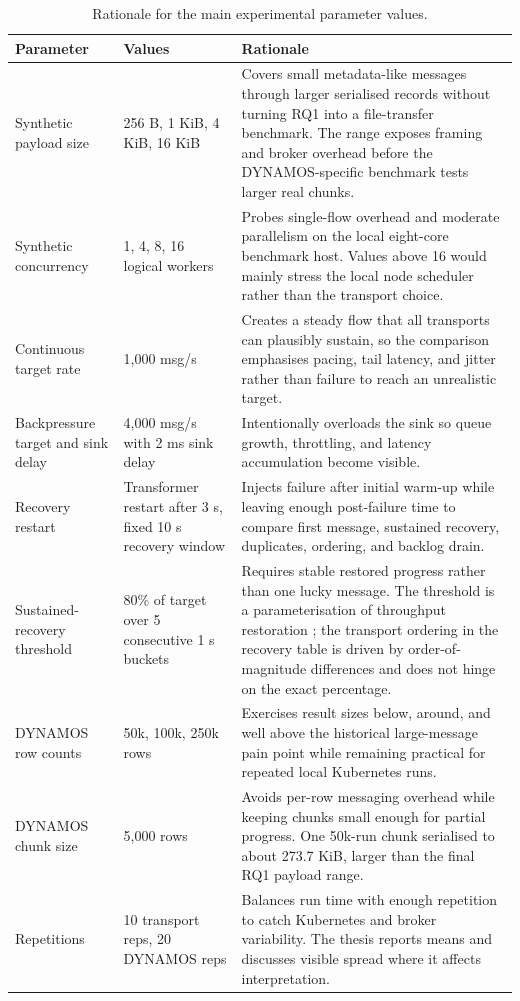 \begin{table}[!htbp]
    \centering
    \scriptsize
    \caption{Rationale for the main experimental parameter values.}
    \label{tab:parameter-rationale}
    \setlength{\tabcolsep}{3pt}
    \begin{tabularx}{\textwidth}{p{}p{}X}
        \toprule
        Parameter & Values & Rationale \\
        \midrule
        Synthetic payload size & 256 B, 1 KiB, 4 KiB, 16 KiB & Covers small metadata-like messages through larger serialised records without turning RQ1 into a file-transfer benchmark. The range exposes framing and broker overhead before the DYNAMOS-specific benchmark tests larger real chunks. \\
        Synthetic concurrency & 1, 4, 8, 16 logical workers & Probes single-flow overhead and moderate parallelism on the local eight-core benchmark host. Values above 16 would mainly stress the local node scheduler rather than the transport choice. \\
        Continuous target rate & 1{,}000 msg/s & Creates a steady flow that all transports can plausibly sustain, so the comparison emphasises pacing, tail latency, and jitter rather than failure to reach an unrealistic target. \\
        Backpressure target and sink delay & 4{,}000 msg/s with 2 ms sink delay & Intentionally overloads the sink so queue growth, throttling, and latency accumulation become visible. \\
        Recovery restart & Transformer restart after 3 s, fixed 10 s recovery window & Injects failure after initial warm-up while leaving enough post-failure time to compare first message, sustained recovery, duplicates, ordering, and backlog drain. \\
        Sustained-recovery threshold & 80\% of target over 5 consecutive 1 s buckets & Requires stable restored progress rather than one lucky message. The threshold is a parameterisation of throughput restoration \cite{vogel2024faultRecovery}; the transport ordering in the recovery table is driven by order-of-magnitude differences and does not hinge on the exact percentage. \\
        DYNAMOS row counts & 50k, 100k, 250k rows & Exercises result sizes below, around, and well above the historical large-message pain point while remaining practical for repeated local Kubernetes runs. \\
        DYNAMOS chunk size & 5{,}000 rows & Avoids per-row messaging overhead while keeping chunks small enough for partial progress. One 50k-run chunk serialised to about 273.7 KiB, larger than the final RQ1 payload range. \\
        Repetitions & 10 transport reps, 20 DYNAMOS reps & Balances run time with enough repetition to catch Kubernetes and broker variability. The thesis reports means and discusses visible spread where it affects interpretation. \\
        \bottomrule
    \end{tabularx}
\end{table}

